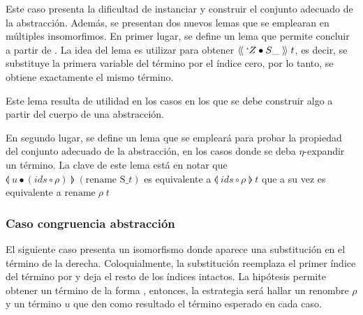 \documentclass[]{report}
\begin{document}
	Este caso presenta la dificultad de instanciar y construir el conjunto adecuado de la abstracción.
	Además, se presentan dos nuevos lemas que se emplearan en múltiples insomorfimos.
	En primer lugar, se define un lema que permite concluir \snstar{} a partir de \snstar {} .
	La idea del lema es utilizar  para obtener $\langle\!\langle\; `Z \bullet S\_ \;\rangle\!\rangle\;t$, es decir, se substituye la primera variable del término por el índice cero, por lo tanto, se obtiene exactamente el mismo término.
	
	
	Este lema resulta de utilidad en los casos en los que se debe construir algo a partir del cuerpo de una abstracción.
	
	
	En segundo lugar, se define un lema que se empleará para probar la propiedad del conjunto adecuado de la abstracción, en los casos donde se deba $\eta$-expandir un término.
	La clave de este lema está en notar que $\llangle\; u \bullet (ids \circ \rho) \;\rrangle\;(\text{rename S\_ } t)$ es equivalente a $\llangle\; ids \circ \rho \;\rrangle\; t$ que a su vez es equivalente a $\text{rename}\;\rho\; t$
	
	
	
	\subsubsection{Caso congruencia abstracción}
	
	El siguiente caso presenta un isomorfismo donde aparece una substitución en el término de la derecha.
	Coloquialmente, la substitución  reemplaza el primer índice del término por
	\AgdaOperator{\AgdaInductiveConstructor{[}}\AgdaSpace{}%
	\AgdaSpace{}%
	\AgdaOperator{\AgdaInductiveConstructor{]≡}}\AgdaSpace{}%
	\AgdaSymbol{(}\AgdaSpace{}%
	\AgdaSymbol{)}
	y deja el resto de los índices intactos.
	La hipótesis  permite obtener un término de la forma
	\snstar
	\AgdaSymbol{(}\AgdaSpace{}%
	\AgdaSpace{}%
	\AgdaSpace{}%
	\AgdaSymbol{(}\AgdaSpace{}%
	\AgdaSpace{}%
	\AgdaSymbol{)}\AgdaSpace{}%
	\AgdaSpace{}%
	\AgdaSymbol{)}
	, entonces, la estrategia será hallar un renombre $\rho$ y un término $u$ que den como resultado el término esperado en cada caso.
	
\end{document}
